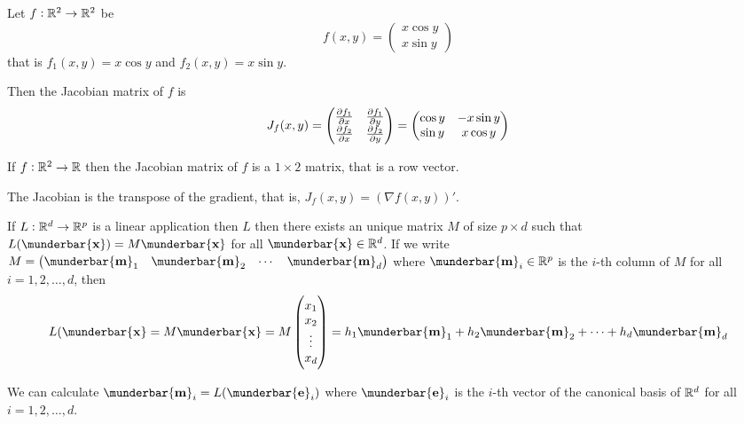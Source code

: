 \documentclass[14pt]{extarticle}
\renewcommand{\vec}[1]{\munderbar{\mathbf{#1}}}
\begin{document}
\begin{example}
    Let $f: \mathbb{R}^2 \to \mathbb{R}^2$ be
    \begin{equation}
        f(x, y) = \begin{pmatrix}
            x \cos y \\
            x \sin y
        \end{pmatrix}
    \end{equation}
    that is $f_1(x, y) = x \cos y$ and $f_2(x, y) = x \sin y$.

    Then the Jacobian matrix of $f$ is
    \begin{equation}
        J_f(x, y) = \begin{pmatrix}
            \pdv{f_1}{x}() & \pdv{f_1}{y}() \\
            \pdv{f_2}{x}() & \pdv{f_2}{y}()
        \end{pmatrix} = \begin{pmatrix}
            \cos y & -x \sin y \\
            \sin y & x \cos y
        \end{pmatrix}
    \end{equation}
\end{example}

\begin{example}[Jacobian of $f: \R^2 \to \R$]
    If $f: \R^2 \to \R$ then the Jacobian matrix of $f$ is a $1 \times 2$ matrix, that is a row vector.
\end{example}

\begin{remark}
    The Jacobian is the transpose of the gradient, that is, $J_f(x, y) = \left(\nabla f(x, y)\right)'$.
\end{remark}

\begin{lemma}
    If $L: \mathbb{R}^d \to \mathbb{R}^p$ is a linear application then $L$ then there exists an unique matrix $M$ of size $p \times d$ such that $L(\vec{x}) = M \vec{x}$ for all $\vec{x} \in \R^d$.
    If we write $M = \begin{pmatrix} \vec{m}_1 & \vec{m}_2 & \cdots & \vec{m}_d \end{pmatrix}$ where $\vec{m}_i \in \R^p$ is the $i$-th column of $M$ for all $i = 1, 2, \ldots, d$, then
    \begin{equation}
        L(\vec{x} = M\vec{x} = M \begin{pmatrix}
            x_1    \\
            x_2    \\
            \vdots \\
            x_d
        \end{pmatrix} = h_1 \vec{m}_1 + h_2 \vec{m}_2 + \cdots + h_d \vec{m}_d
    \end{equation}
\end{lemma}
\begin{remark}
    We can calculate $\vec{m}_i = L(\vec{e}_i)$ where $\vec{e}_i$ is the $i$-th vector of the canonical basis of $\mathbb{R}^d$ for all $i = 1, 2, \ldots, d$.
\end{remark}
\end{document}
